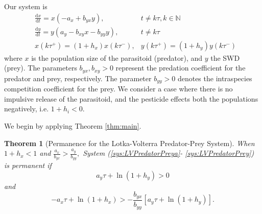 \documentclass{article}
\newtheorem{theorem}{Theorem}[section]
\theoremstyle{definition}
\newcommand{\rd}{\text{d}}
\newcommand{\N}{{\mathbb{N}}}
\begin{document}
Our system is 
    \begin{align}
         &\frac{\rd x}{\rd t} = x\left(-a_x + b_{yx}y\right), & t \neq k\tau, k \in \N \label{sys:LVPredatorPreya}\\
&\frac{\rd y}{\rd t} = y\left(a_y - b_{xy}x - b_{yy}y\right),  & t \neq k\tau\\
&x(k\tau^+)= (1 + h_x)x(k\tau^-), &y(k\tau^+)= (1 + h_y)y(k\tau^-)\label{sys:LVPredatorPrey}
    \end{align}
where $x$ is the population size of the parasitoid (predator), and $y$ the SWD (prey). The parameters $b_{yx},b_{xy} > 0$ represent the predation coefficient for the predator and prey, respectively. The parameter $b_{yy}>0$ denotes the intraspecies competition coefficient for the prey. We consider a case where there is no impulsive release of the parasitoid, and the pesticide effects both the populations negatively, i.e. $1 + h_i < 0.$ 

We begin by applying Theorem \ref{thm:main}. 
\begin{theorem}[Permanence for the Lotka-Volterra Predator-Prey System]
When $1 + h_x < 1$ and $\frac{a_x}{b_{yx}} > \frac{a_y}{b_{yy}},$ System (\ref{sys:LVPredatorPreya}- \ref{sys:LVPredatorPrey}) is permanent if 
$$
a_y \tau + \ln(1 + h_y ) > 0
$$
and
$$-a_x \tau + \ln(1 + h_x) > -\frac{b_{yx}}{b_{yy}}\left[a_y \tau + \ln(1 + h_y )\right].$$

\end{theorem}
\end{document}
